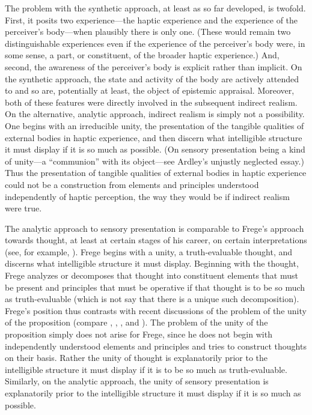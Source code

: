 
The problem with the synthetic approach, at least as so far developed, is twofold. First, it posits two experience---the haptic experience and the experience of the perceiver's body---when plausibly there is only one. (These would remain two distinguishable experiences even if the experience of the perceiver's body were, in some sense, a part, or constituent, of the broader haptic experience.) And, second, the awareness of the perceiver's body is explicit rather than implicit. On the synthetic approach, the state and activity of the body are actively attended to and so are, potentially at least, the object of epistemic appraisal. Moreover, both of these features were directly involved in the subsequent indirect realism. On the alternative, analytic approach, indirect realism is simply not a possibility. One begins with an irreducible unity, the presentation of the tangible qualities of external bodies in haptic experience, and then discern what intelligible structure it must display if it is so much as possible. (On sensory presentation being a kind of unity---a ``communion'' with its object---see Ardley's \citeyear{Ardley:1958aa} unjustly neglected essay.) Thus the presentation of tangible qualities of external bodies in haptic experience could not be a construction from elements and principles understood independently of haptic perception, the way they would be if indirect realism were true.

The analytic approach to sensory presentation is comparable to Frege's approach towards thought, at least at certain stages of his career, on certain interpretations (see, for example, \citealt[essays 7 and 9]{Travis:2011qd}). Frege begins with a unity, a truth-evaluable thought, and discerns what intelligible structure it must display. Beginning with the thought, Frege analyzes or decomposes that thought into constituent elements that must be present and principles that must be operative if that thought is to be so much as truth-evaluable (which is not say that there is a unique such decomposition). Frege's position thus contrasts with recent discussions of the problem of the unity of the proposition (compare \citealt{King:2007ad}, \citealt{Gaskin:2008aa}, \citealt{Soames:2010qq}, and \citealt{King:2014ls}). The problem of the unity of the proposition simply does not arise for Frege, since he does not begin with independently understood elements and principles and tries to construct thoughts on their basis. Rather the unity of thought is explanatorily prior to the intelligible structure it must display if it is to be so much as truth-evaluable. Similarly, on the analytic approach, the unity of sensory presentation is explanatorily prior to the intelligible structure it must display if it is so much as possible.

